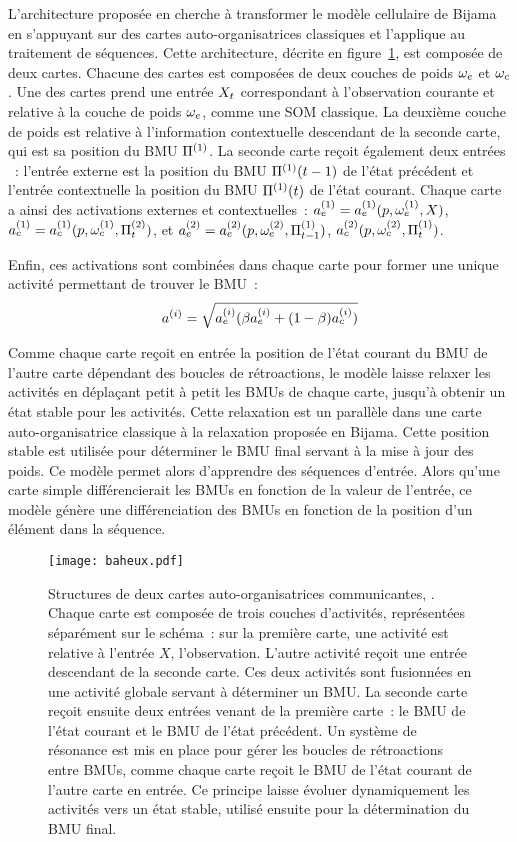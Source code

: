 \documentclass[../main]{subfiles}
\begin{document}
L'architecture proposée en \cite{baheux_towards_2014} cherche à transformer le modèle cellulaire de Bijama en s'appuyant sur des cartes auto-organisatrices classiques et l'applique au traitement de séquences. Cette architecture, décrite en figure~\ref{fig:baheux}, est composée de deux cartes. 
Chacune des cartes est composées de deux couches de poids $\omega_e$ et $\omega_c$. Une des cartes prend une entrée $X_t$ correspondant à l'observation courante et relative à la couche de poids $\omega_e$, comme une SOM classique. 
La deuxième couche de poids est relative à l'information contextuelle descendant de la seconde carte, qui est sa position du BMU $\Pi^{({1})}$.
La seconde carte reçoit également deux entrées ~: l'entrée externe est la position du BMU $\Pi^{({1})}(t-1)$ de l'état précédent et l'entrée contextuelle la position du BMU $\Pi^{({1})}(t)$ de l'état courant. 
Chaque carte a ainsi des activations externes et contextuelles~: $a_e^{({1})} = a_e^{({1})}(p, \omega_e^{({1})},X)$, $a_c^{({1})} =  a_c^{({1})}(p, \omega_c^{({1})},\Pi^{({2})}_t)$, et $a_e^{({2})} = a_e^{({2})}(p, \omega_e^{({2})},\Pi^{({1})}_{t-1})$, $a_c^{({2})}(p, \omega_c^{({2})}, \Pi^{({1})}_t)$.

Enfin, ces activations sont combinées dans chaque carte pour former une unique activité permettant de trouver le BMU~:
$$
a^{({i})} = \sqrt{a_e^{({i})}(\beta a_e^{({i})} + (1-\beta) a_c^{({i})})}
$$

Comme chaque carte reçoit en entrée la position de l'état courant du BMU de l'autre carte dépendant des boucles de rétroactions, le modèle laisse relaxer les activités en déplaçant petit à petit les BMUs de chaque carte, jusqu'à obtenir un état stable pour les activités. Cette relaxation est un parallèle dans une carte auto-organisatrice classique à la relaxation proposée en Bijama.
Cette position stable est utilisée pour déterminer le BMU final servant à la mise à jour des poids.
Ce modèle permet alors d'apprendre des séquences d'entrée. Alors qu'une carte simple différencierait les BMUs en fonction de la valeur de l'entrée, ce modèle génère une différenciation des BMUs en fonction de la position d'un élément dans la séquence.


\begin{figure}
    \centering
    \texttt{[image: baheux.pdf]}
    \caption{Structures de deux cartes auto-organisatrices communicantes, \parencite{baheux_towards_2014}. Chaque carte est composée de trois couches d'activités, représentées séparément sur le schéma~: sur la première carte, une activité est relative à l'entrée $X$, l'observation. L'autre activité reçoit une entrée descendant de la seconde carte. Ces deux activités sont fusionnées en une activité globale servant à déterminer un BMU. La seconde carte reçoit ensuite deux entrées venant de la première carte~: le BMU de l'état courant et le BMU de l'état précédent. Un système de résonance est mis en place pour gérer les boucles de rétroactions entre BMUs, comme chaque carte reçoit le BMU de l'état courant de l'autre carte en entrée. Ce principe laisse évoluer dynamiquement les activités vers un état stable, utilisé ensuite pour la détermination du BMU final.\label{fig:baheux}}
\end{figure}
\end{document}
